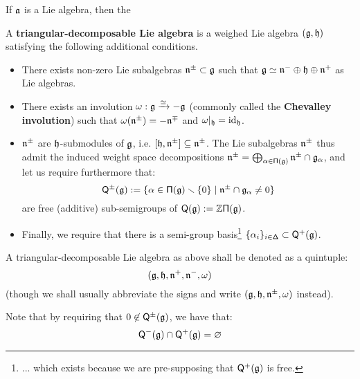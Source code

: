         \begin{convention}
            If $\mathfrak{a}$ is a Lie algebra, then the 
        \end{convention}
        \begin{definition} \label{def: triangular_decomposable_lie_algebras}
            A \textbf{triangular-decomposable Lie algebra} is a weighed Lie algebra $(\mathfrak{g}, \mathfrak{h})$ satisfying the following additional conditions.
            \begin{itemize}
                \item There exists non-zero Lie subalgebras $\mathfrak{n}^{\pm} \subset \mathfrak{g}$ such that $\mathfrak{g} \simeq \mathfrak{n}^- \oplus \mathfrak{h} \oplus \mathfrak{n}^+$ as Lie algebras.
                \item There exists an involution $\omega: \mathfrak{g} \xrightarrow[]{\simeq} -\mathfrak{g}$ (commonly called the \textbf{Chevalley involution}) such that $\omega(\mathfrak{n}^{\pm}) = -\mathfrak{n}^{\mp}$ and $\omega|_{\mathfrak{h}} = \mathrm{id}_{\mathfrak{h}}$.
                \item $\mathfrak{n}^{\pm}$ are $\mathfrak{h}$-submodules of $\mathfrak{g}$, i.e. $[\mathfrak{h}, \mathfrak{n}^{\pm}] \subseteq \mathfrak{n}^{\pm}$. The Lie subalgebras $\mathfrak{n}^{\pm}$ thus admit the induced weight space decompositions $\mathfrak{n}^{\pm} = \bigoplus_{\alpha \in \mathsf{\Pi}(\mathfrak{g})} \mathfrak{n}^{\pm} \cap \mathfrak{g}_{\alpha}$, and let us require furthermore that:
                    $$\mathsf{Q}^{\pm}(\mathfrak{g}) := \{ \alpha \in \mathsf{\Pi}(\mathfrak{g}) \smallsetminus \{0\} \mid \mathfrak{n}^{\pm} \cap \mathfrak{g}_{\alpha} \not = 0 \}$$
                are free (additive) sub-semigroups of $\mathsf{Q}(\mathfrak{g}) := \mathbb{Z}\mathsf{\Pi}(\mathfrak{g})$.
                \item Finally, we require that there is a semi-group basis\footnote{... which exists because we are pre-supposing that $\mathsf{Q}^+(\mathfrak{g})$ is free.} $\{\alpha_i\}_{i \in \mathsf{\Delta}} \subset \mathsf{Q}^+(\mathfrak{g})$.
            \end{itemize}
            A triangular-decomposable Lie algebra as above shall be denoted as a quintuple:
                $$(\mathfrak{g}, \mathfrak{h}, \mathfrak{n}^+, \mathfrak{n}^-, \omega)$$
            (though we shall usually abbreviate the signs and write $(\mathfrak{g}, \mathfrak{h}, \mathfrak{n}^{\pm}, \omega)$ instead).
        \end{definition}
        \begin{remark}
            Note that by requiring that $0 \not \in \mathsf{Q}^{\pm}(\mathfrak{g})$, we have that:
                $$\mathsf{Q}^-(\mathfrak{g}) \cap \mathsf{Q}^+(\mathfrak{g}) = \varnothing$$
        \end{remark}
